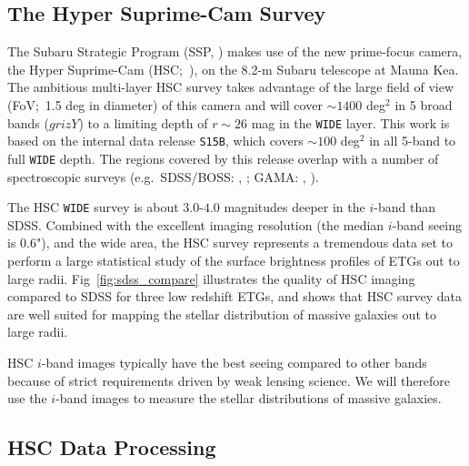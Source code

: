\documentclass[a4paper,fleqn,usenatbib]{mnras}
\begin{document}
\subsection{The Hyper Suprime-Cam Survey}
    \label{ssec:hsc}

    The Subaru Strategic Program (SSP, \citealt{MiyazakiInPrep}) makes use of the new 
    prime-focus camera, the Hyper Suprime-Cam (HSC;~\citealt{Miyazaki2012}), on the 
    8.2-m Subaru telescope at Mauna Kea. 
    The ambitious multi-layer HSC survey takes advantage of the large field of 
    view (FoV;~1.5 deg in diameter) of this camera and will cover $\sim 1400$ deg$^2$ 
    in 5 broad bands ($grizY$) to a limiting depth of $r \sim 26$ mag 
    in the \texttt{WIDE} layer. 
    This work is based on the internal data release \texttt{S15B}, which covers 
    $\sim 100$ deg$^2$ in all 5-band to full \texttt{WIDE} depth.  
    The regions covered by this release overlap with a number of spectroscopic surveys 
    (e.g.\ SDSS/BOSS: \citealt{Eisenstein2011}, \citealt{Alam2015}; 
    GAMA: \citealt{Driver2011}, \citealt{Liske2015}).

    The HSC \texttt{WIDE} survey is about $3.0$-$4.0$ magnitudes deeper in the $i$-band 
    than SDSS. 
    Combined with the excellent imaging resolution (the median $i$-band seeing is 0.6"), 
    and the wide area, the HSC survey represents a tremendous data set to perform a 
    large statistical study of the surface brightness profiles of ETGs out to large radii.     
    Fig~\ref{fig:sdss_compare} illustrates the quality of HSC imaging compared to SDSS 
    for three low redshift ETGs, and shows that HSC survey data are well suited for 
    mapping the stellar distribution of massive galaxies out to large radii.

	HSC $i$-band images typically have the best seeing compared to other bands because 
	of strict requirements driven by weak lensing science. 
    We will therefore use the $i$-band images to measure the stellar distributions of 
    massive galaxies.
    
\subsection{HSC Data Processing}
    \label{sec:pipeline}
\end{document}
